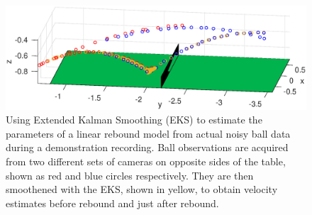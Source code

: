 \begin{figure}[t!]
\centering
\includegraphics[scale=0.38]{trainBounce.eps}			
\caption{Using Extended Kalman Smoothing (EKS) to estimate the parameters of a linear rebound model from actual noisy ball data during a demonstration recording. Ball observations are acquired from two different sets of cameras on opposite sides of the table, shown as red and blue circles respectively. They are then smoothened with the EKS, shown in yellow, to obtain velocity estimates before rebound and just after rebound.} 
\label{trainBounce}
\end{figure}

